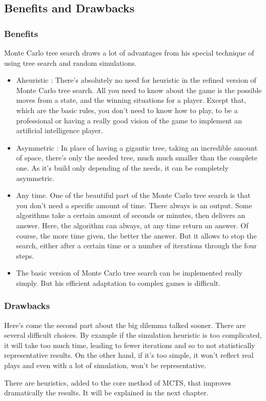 \subsection{Benefits and Drawbacks}

\subsubsection{Benefits}

Monte Carlo tree search draws a lot of advantages from his special technique of using tree search and random simulations. 
\begin{itemize}
\item Aheuristic : There's absolutely no need for heuristic in the refined version of Monte Carlo tree search. All you need to know about the game is the possible moves from a state, and the winning situations for a player. Except that, which are the basic rules, you don't need to know how to play, to be a professional or having a really good vision of  the game to implement an artificial intelligence player.
\item Asymmetric : In place of having a gigantic tree, taking an incredible amount of space, there's only the needed tree, much much smaller than the complete one. As it's build only depending of the needs, it can be completely asymmetric. 
\item Any time. One of the beautiful part of the Monte Carlo tree search is that you don't need a specific amount of time. There always is an output. Some algorithms take a certain amount of seconds or minutes, then delivers an answer. Here, the algorithm can always, at any time return an answer. Of course, the more time given, the better the answer. But it allows to stop the search, either after a certain time or a number of iterations through the four steps. 
\item The basic version of Monte Carlo tree search can be implemented really simply. But his efficient adaptation to complex games is difficult. 
\end{itemize}

\subsubsection{Drawbacks}

Here's come the second part about the big dilemma talked sooner.  There are several difficult choices. By example if the simulation heuristic is too complicated, it will take too much time, leading to fewer iterations and so to not statistically representative results. On the other hand, if it's too simple, it won't reflect real plays and even with a lot of simulation, won't be representative. 

There are heuristics, added to the core method of MCTS, that improves dramatically the results. It will be explained in the next chapter. 